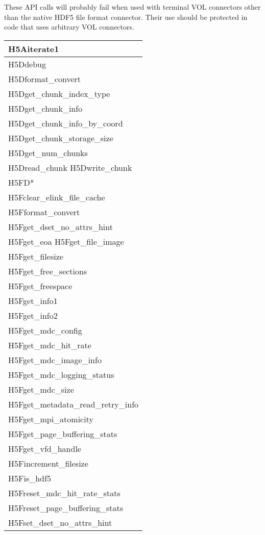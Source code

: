 These API calls will probably fail when used with terminal VOL connectors other than the native HDF5 file format connector. Their use should be protected in code that uses arbitrary VOL connectors.
\begin{longtable}{ |>{\raggedright\arraybackslash}p{\linewidth}| }
    \hline
    H5Aiterate1 \\
    \hline
    H5Ddebug \\
    H5Dformat\_convert \\
    H5Dget\_chunk\_index\_type \\
    H5Dget\_chunk\_info \\
    H5Dget\_chunk\_info\_by\_coord \\
    H5Dget\_chunk\_storage\_size \\
    H5Dget\_num\_chunks \\
    H5Dread\_chunk H5Dwrite\_chunk \\
    \hline
    H5FD* \\
    \hline
    H5Fclear\_elink\_file\_cache \\
    H5Fformat\_convert \\
    H5Fget\_dset\_no\_attrs\_hint \\
    H5Fget\_eoa H5Fget\_file\_image \\
    H5Fget\_filesize \\
    H5Fget\_free\_sections \\
    H5Fget\_freespace \\
    H5Fget\_info1 \\
    H5Fget\_info2 \\
    H5Fget\_mdc\_config \\
    H5Fget\_mdc\_hit\_rate \\
    H5Fget\_mdc\_image\_info \\
    H5Fget\_mdc\_logging\_status \\
    H5Fget\_mdc\_size \\
    H5Fget\_metadata\_read\_retry\_info \\
    H5Fget\_mpi\_atomicity \\
    H5Fget\_page\_buffering\_stats \\
    H5Fget\_vfd\_handle \\
    H5Fincrement\_filesize \\
    H5Fis\_hdf5 \\
    H5Freset\_mdc\_hit\_rate\_stats \\
    H5Freset\_page\_buffering\_stats \\
    H5Fset\_dset\_no\_attrs\_hint \\

\end{longtable}
